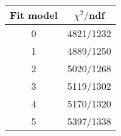 \begin{tabular}{c|c}
Fit model & $\chi^2/$ndf \\
\hline
0 & 4821/1232\\
1 & 4889/1250\\
2 & 5020/1268\\
3 & 5119/1302\\
4 & 5170/1320\\
5 & 5397/1338\\
\end{tabular}
